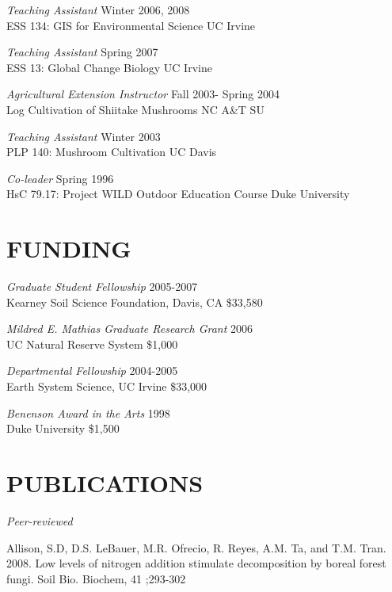 \documentclass[line]{res}
\begin{document}
\begin{resume}
{\sl Teaching Assistant} \hfill                               Winter 2006, 2008\\
ESS 134: GIS for Environmental Science \hfill                   UC Irvine

{\sl Teaching Assistant} \hfill                                     Spring 2007\\
ESS 13: Global Change Biology  \hfill                           UC Irvine

{\sl Agricultural Extension Instructor} \hfill            Fall 2003- Spring 2004\\
Log Cultivation of Shiitake Mushrooms \hfill                 NC A\&T SU

{\sl Teaching Assistant} \hfill                                     Winter 2003\\
PLP 140: Mushroom Cultivation \hfill                             UC Davis

{\sl Co-leader} \hfill                                               Spring 1996\\
HsC 79.17: Project WILD Outdoor Education Course \hfill        Duke University

\section{FUNDING}
{\sl Graduate Student Fellowship} \hfill       2005-2007\\
Kearney Soil Science Foundation, Davis, CA \hfill        \$33,580

{\sl Mildred E. Mathias Graduate Research Grant} \hfill 2006\\
UC Natural Reserve System \hfill        \$1,000

{\sl Departmental Fellowship} \hfill 2004-2005\\
Earth System Science, UC Irvine \hfill        \$33,000

{\sl Benenson Award in the Arts} \hfill  1998\\
Duke University \hfill        \$1,500

 
\section{PUBLICATIONS} 
{\sl Peer-reviewed}

Allison, S.D, D.S. LeBauer, M.R. Ofrecio, R. Reyes, A.M. Ta, and T.M. Tran. 2008. Low levels of nitrogen addition stimulate decomposition by boreal forest fungi. Soil Bio. Biochem, 41
;293-302 


\end{resume}
\end{document}
